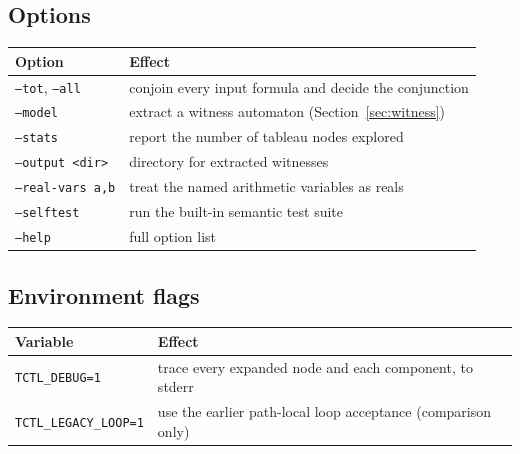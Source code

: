 \subsection{Options}

\begin{center}
\begin{tabular}{ll}
\toprule
Option & Effect \\
\midrule
\texttt{--tot}, \texttt{--all} & conjoin every input formula and decide the conjunction \\
\texttt{--model} & extract a witness automaton (Section~\ref{sec:witness}) \\
\texttt{--stats} & report the number of tableau nodes explored \\
\texttt{--output <dir>} & directory for extracted witnesses \\
\texttt{--real-vars a,b} & treat the named arithmetic variables as reals \\
\texttt{--selftest} & run the built-in semantic test suite \\
\texttt{--help} & full option list \\
\bottomrule
\end{tabular}
\end{center}

\subsection{Environment flags}

\begin{center}
\begin{tabular}{ll}
\toprule
Variable & Effect \\
\midrule
\texttt{TCTL\_DEBUG=1} & trace every expanded node and each component, to stderr \\
\texttt{TCTL\_LEGACY\_LOOP=1} & use the earlier path-local loop acceptance (comparison only) \\
\bottomrule
\end{tabular}
\end{center}
